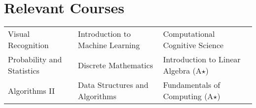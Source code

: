 \section*{Relevant Courses}
\vspace{-2mm}
\begin{tabularx}{\textwidth}{X X X}
    Visual Recognition &
    Introduction to Machine Learning &
    Computational Cognitive Science \\
    Probability and Statistics &
    Discrete Mathematics &
    Introduction to Linear Algebra (A$\star$) \\
    Algorithms II &
    Data Structures and Algorithms &
    Fundamentals of Computing (A$\star$)
\end{tabularx}\\[-2mm]
